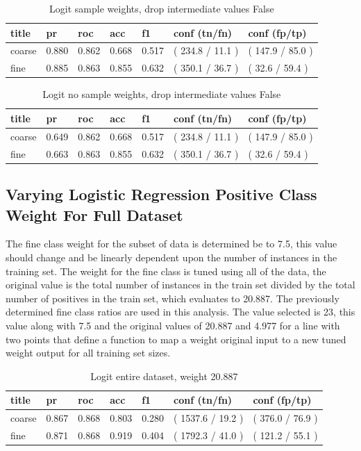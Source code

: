 \documentclass[ms]{nuthesis}
\begin{document}
\FloatBarrier
\begin{table}[h]
\centering
\caption{Logit sample weights, drop intermediate values False}
\label{tab:LogReg-DropFalse}
\begin{tabular}{|l||l||l||l||l||l||l|}\toprule
title & pr & roc & acc & f1 & conf (tn/fn) & conf (fp/tp) \\ \midrule
coarse & 0.880 & 0.862 & 0.668 & 0.517 & ( 234.8 / 11.1 ) & ( 147.9 / 85.0 ) \\
fine & 0.885 & 0.863 & 0.855 & 0.632 & ( 350.1 / 36.7 ) & ( 32.6 / 59.4 ) \\ \bottomrule
\end{tabular}
\end{table}
\FloatBarrier

\FloatBarrier
\begin{table}[h]
\centering
\caption{Logit no sample weights, drop intermediate values False}
\label{tab:LogReg-NoSW-DropFalse}
\begin{tabular}{|l||l||l||l||l||l||l|}\toprule
title & pr & roc & acc & f1 & conf (tn/fn) & conf (fp/tp) \\ \midrule
coarse & 0.649 & 0.862 & 0.668 & 0.517 & ( 234.8 / 11.1 ) & ( 147.9 / 85.0 ) \\
fine & 0.663 & 0.863 & 0.855 & 0.632 & ( 350.1 / 36.7 ) & ( 32.6 / 59.4 ) \\ \bottomrule
\end{tabular}
\end{table}
\FloatBarrier


\subsection{Varying Logistic Regression Positive Class Weight For Full Dataset}
\par The fine class weight for the subset of data is determined be to 7.5, this value
should change and be linearly dependent upon the number of instances in the training set.
The weight for the fine class is tuned using all of the data, the original value is the total number
of instances in the train set divided by the total number of positives in the train set, which evaluates
to 20.887. The previously determined fine class ratios are used in this analysis. The value selected is
23, this value along with 7.5 and the original values of 20.887 and 4.977 for a line with two points that
define a function to map a weight original input to a new tuned weight output for all training set sizes.

\FloatBarrier
\begin{table}[H]
\centering
\caption{Logit entire dataset, weight 20.887}
\label{tab:LogRegAllOrig-Wt20p887}
\begin{tabular}{|l||l||l||l||l||l||l|}\toprule
title & pr & roc & acc & f1 & conf (tn/fn) & conf (fp/tp) \\ \midrule
coarse & 0.867 & 0.868 & 0.803 & 0.280 & ( 1537.6 / 19.2 ) & ( 376.0 / 76.9 ) \\
fine & 0.871 & 0.868 & 0.919 & 0.404 & ( 1792.3 / 41.0 ) & ( 121.2 / 55.1 ) \\ \bottomrule
\end{tabular}
\end{table}
\FloatBarrier
\end{document}
